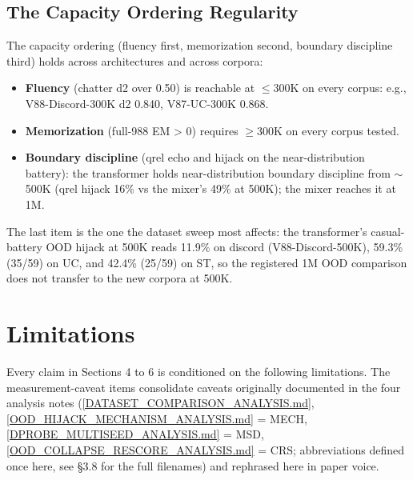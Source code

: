 \documentclass[11pt]{article}
\begin{document}
\subsection{The Capacity Ordering Regularity}

The capacity ordering (fluency first, memorization second, boundary discipline third) holds across architectures and across corpora:

\begin{itemize}
  \item \textbf{Fluency} (chatter d2 over 0.50) is reachable at $\leq 300$K on every corpus: e.g., V88-Discord-300K d2 0.840, V87-UC-300K 0.868.
  \item \textbf{Memorization} (full-988 EM > 0) requires $\geq 300$K on every corpus tested.
  \item \textbf{Boundary discipline} (qrel echo and hijack on the near-distribution battery): the transformer holds near-distribution boundary discipline from $\sim$500K (qrel hijack 16\% vs the mixer's 49\% at 500K); the mixer reaches it at 1M.
\end{itemize}

The last item is the one the dataset sweep most affects: the transformer's casual-battery OOD hijack at 500K reads 11.9\% on discord (V88-Discord-500K), 59.3\% (35/59) on UC, and 42.4\% (25/59) on ST, so the registered 1M OOD comparison does not transfer to the new corpora at 500K.

\section{Limitations}

Every claim in Sections 4 to 6 is conditioned on the following limitations. The measurement-caveat items consolidate caveats originally documented in the four analysis notes (\href{https://github.com/llaa33219/MicroMixer-4/blob/4bb630413dfa58ef3141291e121ab8c006d03235/DATASET_COMPARISON_ANALYSIS.md}{[DATASET\_\allowbreak COMPARISON\_\allowbreak ANALYSIS.md]}, \href{https://github.com/llaa33219/MicroMixer-4/blob/4bb630413dfa58ef3141291e121ab8c006d03235/OOD_HIJACK_MECHANISM_ANALYSIS.md}{[OOD\_\allowbreak HIJACK\_\allowbreak MECHANISM\_\allowbreak ANALYSIS.md]} = MECH, \href{https://github.com/llaa33219/MicroMixer-4/blob/4bb630413dfa58ef3141291e121ab8c006d03235/DPROBE_MULTISEED_ANALYSIS.md}{[DPROBE\_\allowbreak MULTISEED\_\allowbreak ANALYSIS.md]} = MSD, \href{https://github.com/llaa33219/MicroMixer-4/blob/4bb630413dfa58ef3141291e121ab8c006d03235/OOD_COLLAPSE_RESCORE_ANALYSIS.md}{[OOD\_\allowbreak COLLAPSE\_\allowbreak RESCORE\_\allowbreak ANALYSIS.md]} = CRS; abbreviations defined once here, see \S3.8 for the full filenames) and rephrased here in paper voice.
\end{document}
